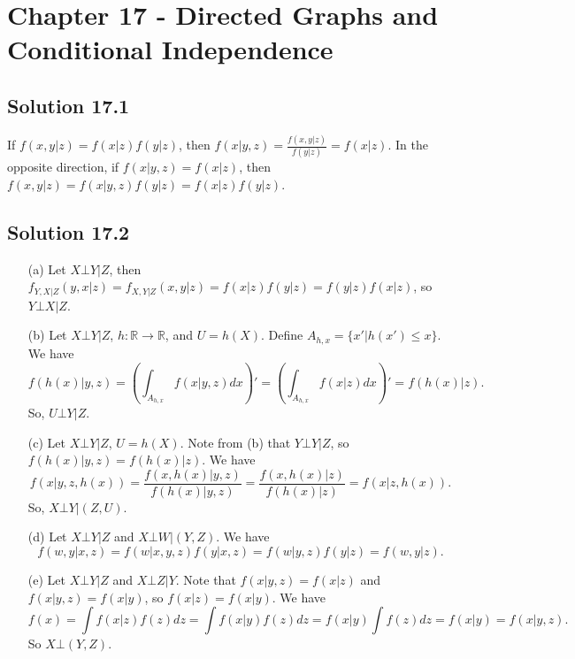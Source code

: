 \section*{Chapter 17 - Directed Graphs and Conditional Independence}

\subsection*{Solution 17.1}

If $f(x,y|z) = f(x|z)f(y|z)$, then $f(x|y,z) = \frac{f(x,y|z)}{f(y|z)} = f(x|z)$.
In the opposite direction, if $f(x|y,z) = f(x|z)$, then $f(x,y|z) = f(x|y,z)f(y|z) = f(x|z)f(y|z)$.


\subsection*{Solution 17.2}

\begin{itemize}
    \item[(a)] Let $X \bot Y | Z$, then $f_{Y,X|Z}(y,x|z) = f_{X,Y|Z}(x,y|z) = f(x|z)f(y|z) = f(y|z)f(x|z)$, so $Y \bot X | Z$.
    \item[(b)] Let $X \bot Y | Z$, $h: \mathbb{R} \to \mathbb{R}$, and $U = h(X)$.
        Define $A_{h,x} = \{x' | h(x') \leq x\}$.
        We have
        \begin{equation*}
            f(h(x)|y,z) = \left(\int_{A_{h,x}} f(x|y,z) dx \right)'
                = \left(\int_{A_{h,x}} f(x|z) dx \right)'
                = f(h(x)|z).
        \end{equation*}
        So, $U \bot Y | Z$.
    \item[(c)] Let $X \bot Y | Z$, $U = h(X)$.
        Note from (b) that $Y \bot Y | Z$, so $f(h(x)|y, z) = f(h(x)|z)$.
        We have
        \begin{equation*}
            f(x|y,z,h(x)) = \frac{f(x,h(x)|y,z)}{f(h(x)|y,z)}
                = \frac{f(x,h(x)|z)}{f(h(x)|z)}
                = f(x|z,h(x)).
        \end{equation*}
        So, $X \bot Y | (Z, U)$.
    \item[(d)] Let $X \bot Y | Z$ and $X \bot W | (Y, Z)$.
        We have
        \begin{equation*}
            f(w,y|x,z) = f(w|x,y,z) f(y|x,z)
                = f(w|y,z) f(y|z)
                = f(w,y|z).
        \end{equation*}
    \item[(e)] Let $X \bot Y | Z$ and $X \bot Z | Y$.
        Note that $f(x|y,z) = f(x|z)$ and $f(x|y,z) = f(x|y)$, so $f(x|z) = f(x|y)$.
        We have
        \begin{equation*}
            f(x) = \int f(x|z)f(z)dz
                = \int f(x|y)f(z)dz
                = f(x|y) \int f(z)dz
                = f(x|y)
                = f(x|y, z).
        \end{equation*}
        So $X \bot (Y, Z)$.
\end{itemize}


